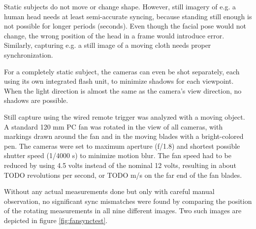 Static subjects do not move or change shape.
However, still imagery of e.g. a human head needs at least semi-accurate syncing, because standing still enough is not possible for longer periods (seconds).
Even though the facial pose would not change, the wrong position of the head in a frame would introduce error.
Similarly, capturing e.g. a still image of a moving cloth needs proper synchronization.

For a completely static subject, the cameras can even be shot separately, each using its own integrated flash unit, to minimize shadows for each viewpoint.
When the light direction is almost the same as the camera's view direction, no shadows are possible.

Still capture using the wired remote trigger was analyzed with a moving object.
A standard 120 mm PC fan was rotated in the view of all cameras, with markings drawn around the fan and in the moving blades with a bright-colored pen.
The cameras were set to maximum aperture (f/1.8) and shortest possible shutter speed (1/4000 s) to minimize motion blur.
The fan speed had to be reduced by using 4.5 volts instead of the nominal 12 volts, resulting in about TODO revolutions per second, or TODO m/s on the far end of the fan blades.

Without any actual measurements done but only with careful manual observation, no significant sync mismatches were found by comparing the position of the rotating measurements in all nine different images.
Two such images are depicted in figure \ref{fig:fansynctest}.


%


